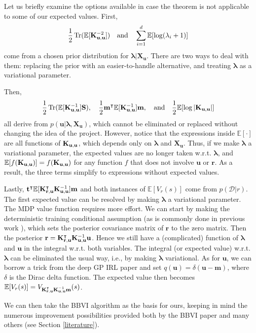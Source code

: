 \documentclass{mprop}
\theoremstyle{definition}
\DeclareMathOperator{\Tr}{Tr}
\begin{document}
Let us briefly examine the options available in case the theorem is not
applicable to some of our expected values. First,
\[ \frac{1}{2}\Tr(\mathbb{E}[\Kuu^{-2}]) \quad \text{and} \quad \sum_{i=1}^d
  \mathbb{E}[\log(\lambda_i + 1)] \]
come from a chosen prior distribution for $\bm\lambda | \mathbf{X_u}$.
There are two ways to deal with them: replacing the prior with an
easier-to-handle alternative, and treating $\bm\lambda$ as a variational
parameter.

Then,
\[ \frac{1}{2}\Tr(\mathbb{E}[\Kuu^{-1}]\mathbf{S}), \quad 
  \frac{1}{2}\mathbf{m}^\intercal\mathbb{E}[\Kuu^{-1}]\mathbf{m}, \quad
  \text{and} \quad \frac{1}{2}\mathbb{E}[\log|\Kuu|] \]
all derive from $p(\mathbf{u} | \bm\lambda, \mathbf{X_u})$, which cannot be
eliminated or replaced without changing the idea of the project. However, notice
that the expressions inside $\mathbb{E}[\cdot]$ are all functions of $\mathbf{K}_{\mathbf{u},\mathbf{u}}$,
which depends only on $\bm\lambda$ and $\mathbf{X_u}$. Thus, if we make
$\bm\lambda$ a variational parameter, the expected values are no longer taken
w.r.t. $\bm\lambda$, and $\mathbb{E}[f(\mathbf{K}_{\mathbf{u},\mathbf{u}})] = f(\mathbf{K}_{\mathbf{u},\mathbf{u}})$ for any function $f$
that does not involve $\mathbf{u}$ or $\mathbf{r}$. As a result, the three
terms simplify to expressions without expected values.

Lastly,
$\mathbf{t}^\intercal\mathbb{E}[\mathbf{K}_{\mathbf{r},\mathbf{u}}^\intercal\mathbf{K}_{\mathbf{u},\mathbf{u}}^{-1}]\mathbf{m}$ and both
instances of $\mathbb{E}[V_r(s)]$ come from $p(\mathcal{D} | r)$. The first
expected value can be resolved by making $\bm\lambda$ a variational
parameter. The MDP value function requires more effort. We can start by making
the deterministic training conditional assumption (as is commonly done in
previous work \cite{DBLP:conf/uai/JinDAS17,DBLP:conf/nips/LevinePK11}), which
sets the posterior covariance matrix of $\mathbf{r}$ to the zero matrix. Then
the posterior $\mathbf{r} = \mathbf{K}_{\mathbf{r},\mathbf{u}}^\intercal\mathbf{K}_{\mathbf{u},\mathbf{u}}^{-1}\mathbf{u}$. Hence we still
have a (complicated) function of $\bm\lambda$ and $\mathbf{u}$ in the integral
w.r.t. both variables. The integral (or expected value) w.r.t. $\bm\lambda$ can
be eliminated the usual way, i.e., by making $\bm\lambda$ variational. As for
$\mathbf{u}$, we can borrow a trick from the deep GP IRL paper
\cite{DBLP:conf/uai/JinDAS17} and set $q(\mathbf{u}) = \delta(\mathbf{u} -
\mathbf{m})$, where $\delta$ is the Dirac delta function. The expected value
then becomes $\mathbb{E}[V_r(s)] = V_{\mathbf{K}_{\mathbf{r},\mathbf{u}}^\intercal\mathbf{K}_{\mathbf{u},\mathbf{u}}^{-1}\mathbf{m}}(s)$.

We can then take the BBVI algorithm as
the basis for ours, keeping in mind the numerous improvement possibilities
provided both by the BBVI paper \cite{DBLP:conf/aistats/RanganathGB14} and many
others (see Section \ref{literature}).
\end{document}
